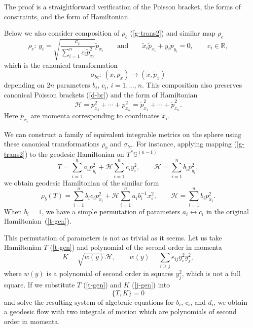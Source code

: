 \documentclass[10pt,a4paper]{amsart}
\numberwithin{equation}{section}
\begin{document}
The proof is a straightforward verification of the Poisson bracket, the forms of constraints, and the form of Hamiltonian.

Below we also consider composition of $\rho_b$ (\ref{g-trans2}) and similar map $\rho_c$
\[
\rho_c\colon \  y_i= \sqrt{\frac{c_i}{\sum_{i=1}^n c_i\tilde{p}_{x_i}^2}} \tilde{p}_{x_i}\qquad\text{and}\qquad \tilde{x}_i\tilde{p}_{x_i}+y_ip_{y_i}=0 ,\qquad c_i\in \mathbb R ,
\]
which is the canonical transformation
\begin{equation}\label{bc-trans}
\sigma_{bc}\colon \ (x,p_{x})\to (\tilde{x},\tilde{p}_x)
\end{equation}
depending on $2n$ parameters $b_{i}$, $c_{i}$, $i=1,\dots,n$. This composition also preserves canonical Poisson brackets (\ref{d-br}) and the form of Hamiltonian
\[
\mathcal H=p_{x_1}^2+\cdots +p_{x_n}^2=\tilde{p}_{x_1}^2+\cdots+ \tilde{p}_{x_n}^2 .
\]
Here $\tilde{p}_{x_i}$ are momenta corresponding to coordinates $\tilde{x}_i$.

We can construct a family of equivalent integrable metrics on the sphere using these canonical transformations $\rho_b$ and $\sigma_{bc}$. For instance, applying mapping (\ref{g-trans2}) to the geodesic Hamiltonian on $T^*\mathbb S^{(n-1)}$
\begin{equation}\label{t-gen}
T=\sum_{i=1}^n a_i p_{y_i}^2+\mathcal H\sum_{i=1}^n c_iy_i^2 ,\qquad \mathcal H=\sum_{i=1}^n b_ip_{y_i}^2 ,
\end{equation}
we obtain geodesic Hamiltonian of the similar form
\begin{equation}\label{t-gen2}
\rho_b(T)=\sum_{i=1}^n b_ic_i p_{x_i}^2+\mathcal H\sum_{i=1}^n a_ib_i^{-1}x_i^2 ,\qquad \mathcal H=\sum_{i=1}^n b_ip_{x_i}^2.
\end{equation}
When $b_i=1$, we have a simple permutation of parameters $a_i\leftrightarrow c_i$ in the original Hamiltonian~(\ref{t-gen}).

This permutation of parameters is not as trivial as it seems. Let us take Hamiltonian $T$ (\ref{t-gen}) and polynomial of the second order in momenta
\begin{equation}\label{j-gen}
K=\sqrt{ w(y) } \mathcal H ,\qquad w(y)=\sum_{i\geq j} e_{ij} y_i^2y_j^2 ,
\end{equation}
where $w(y)$ is a polynomial of second order in squares $y_j^2$, which is not a full square. If we substitute $T$ (\ref{t-gen}) and $K$ (\ref{j-gen}) into
\[
\{T,K\}=0
\]
and solve the resulting system of algebraic equations for $b_i$, $c_i$, and $d_i$, we obtain a geodesic flow with two integrals of motion which are polynomials of second order in momenta.
\end{document}
